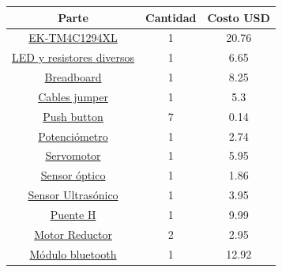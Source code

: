 \documentclass[]{article}
\begin{document}
\begin{table}[h!]
	\centering
	\begin{tabular}{||c|c|c||}
		\hline
		\textbf{Parte} & \textbf{Cantidad}     & \textbf{Costo USD}      \\ \hline\hline
		
		\href{https://www.digikey.com.mx/product-detail/es/texas-instruments/EK-TM4C1294XL/296-37267-ND/4725808}{ EK-TM4C1294XL} & 1 & 20.76 \\ \hline 
		\href{https://www.digikey.com.mx/product-detail/es/pimoroni-ltd/PIM244/PIM244-ND/8126061}{LED y resistores diversos}  & 1 &  6.65   \\ \hline
		\href{https://www.digikey.com.mx/product-detail/es/global-specialties/GS-830/BKGS-830-ND/5231309}{Breadboard} & 1 &  8.25   \\ \hline
		\href{https://www.digikey.com.mx/product-detail/es/bud-industries/BC-32625/377-2093-ND/4156446}{Cables jumper} & 1 & 5.3    \\ \hline
		\href{https://www.digikey.com.mx/product-detail/es/c-k/PTS-647-SM50-SMTR2-LFS/PTS647SM50SMTR2LFSDKR-ND/9649876}{Push button} & 7 & 0.14    \\ \hline
		\href{https://www.digikey.com.mx/product-detail/es/bourns-inc/3310R-125-103L/3310R-125-103L-ND/2537840}{Potenciómetro} & 1 &  2.74  \\ \hline
		\href{https://www.digikey.com.mx/product-detail/es/adafruit-industries-llc/169/1528-1076-ND/5154651}{Servomotor} & 1 &  5.95   \\ \hline
		\href{https://www.digikey.com.mx/product-detail/es/vishay-semiconductor-opto-division/TCST2202/TCST2202-ND/1681171}{Sensor óptico} & 1 & 1.86    \\ \hline
		\href{https://www.digikey.com.mx/product-detail/es/sparkfun-electronics/SEN-13959/1568-1421-ND/6193598}{Sensor Ultrasónico} & 1 &  3.95   \\ \hline
		\href{https://www.digikey.com.mx/product-detail/es/digilent-inc/410-069/1286-1139-ND/4090146}{Puente H} & 1 & 9.99     \\ \hline
		\href{https://www.digikey.com.mx/product-detail/es/adafruit-industries-llc/3777/1528-2589-ND/8687221}{Motor Reductor} & 2 & 2.95    \\ \hline
		\href{https://tinyurl.com/sllgmt5}{Módulo bluetooth}	 & 1 & 12.92    \\ \hline

\end{tabular}
\end{table}
\end{document}
